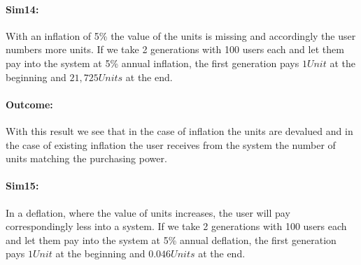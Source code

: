 \paragraph{Sim14:} 
With an inflation of 5\% the value of the units is missing and accordingly the user numbers more units. If we take 2 generations with 100 users each and let them pay into the system at 5\% annual inflation, the first generation pays $1 Unit$ at the beginning and $21,725 Units$ at the end. 

\paragraph{Outcome:}

\begin{table}[hbt!]
\centering
{}
\end{table}

With this result we see that in the case of inflation the units are devalued and in the case of existing inflation the user receives from the system the number of units matching the purchasing power.

\paragraph{Sim15:} In a deflation, where the value of units increases, the user will pay correspondingly less into a system. If we take 2 generations with 100 users each and let them pay into the system at 5\% annual deflation, the first generation pays $1 Unit$ at the beginning and $0.046 Units$ at the end. 

